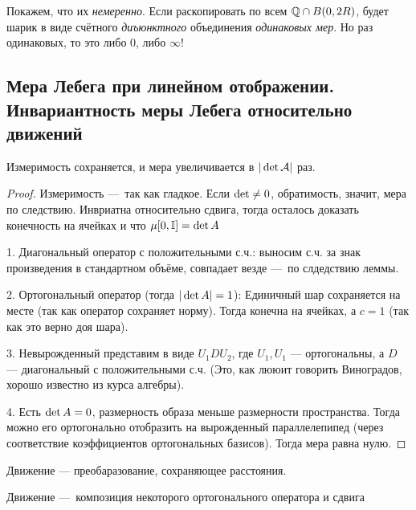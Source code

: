 \documentclass[12pt, a4paper, oneside]{memoir}
\begin{document}
Покажем, что их \textit{немеренно}. Если раскопировать по всем ${\mathbb{Q}} \cap B(0, 2R)$,
будет шарик в виде счётного \textit{диъюнктного} объединения \textit{одинаковых мер}.
Но раз одинаковых, то это либо $0$, либо $\infty$!


\subsection{Мера Лебега при линейном отображении.
Инвариантность меры Лебега относительно движений}


\begin{theorem}

    Измеримость сохраняется, и мера увеличивается в $|\operatorname{det} \mathcal{A}|$ раз.

    \begin{proof}
        Измеримость — так как гладкое.
        Если $\operatorname{det} \neq 0$, обратимость, значит, мера по следствию.
        Инвриатна относительно сдвига, тогда осталось доказать конечность
        на ячейках и что $\mu [0, \mathbb{I}] = \operatorname{det} A$
        
        1. Диагональный оператор с положительными с.ч.:
        выносим с.ч. за знак произведения в стандартном объёме, совпадает везде — по слдедствию леммы.

        2. Ортогональный оператор (тогда $|\operatorname{det} A| = 1$): 
        Единичный шар сохраняется на месте (так как оператор сохраняет норму).
        Тогда конечна на ячейках, а $c = 1$ (так как это верно доя шара).

        3. Невырожденный представим в виде $U_1 D U_2$, где $U_1, U_1$ — ортогональны, а $D$ — диагональный с положительными с.ч.
        (Это, как лююит говорить Виноградов, хорошо известно из курса алгебры).

        4. Есть $\operatorname{det} A = 0$, размерность образа меньше размерности пространства.
        Тогда можно его ортогонально отобразить на вырожденный параллелепипед
        (через соответствие коэффициентов ортогональных базисов). Тогда мера равна нулю.
    \end{proof}
\end{theorem}

\begin{definition}
    Движение — преобаразование, сохраняющее расстояния.
\end{definition}

\begin{remark}
    Движение — композиция некоторого ортогонального оператора и сдвига
\end{remark}
\end{document}
